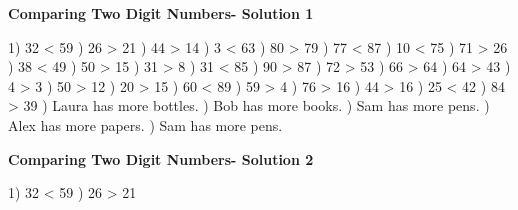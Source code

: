 \documentclass{article}%
\begin{document}
\vspace*{\fill}%
\normalsize%
\pagebreak%
\large%
\begin{center}%
\textbf{Comparing Two Digit Numbers- Solution 1}%
\newline%
\end{center} \normalsize%
1) 32 < 59%
) 26 > 21%
) 44 > 14%
) 3 < 63%
) 80 > 79%
) 77 < 87%
) 10 < 75%
) 71 > 26%
) 38 < 49%
) 50 > 15%
) 31 > 8%
) 31 < 85%
) 90 > 87%
) 72 > 53%
) 66 > 64%
) 64 > 43%
) 4 > 3%
) 50 > 12%
) 20 > 15%
) 60 < 89%
) 59 > 4%
) 76 > 16%
) 44 > 16%
) 25 < 42%
) 84 > 39%
) Laura has more bottles.%
) Bob has more books.%
) Sam has more pens.%
) Alex has more papers.%
) Sam has more pens.%
\newline%
\newpage%
\large%
\begin{center}%
\textbf{Comparing Two Digit Numbers- Solution 2}%
\newline%
\end{center} \normalsize%
1) 32 < 59%
) 26 > 21%
\newline%
\end{document}
